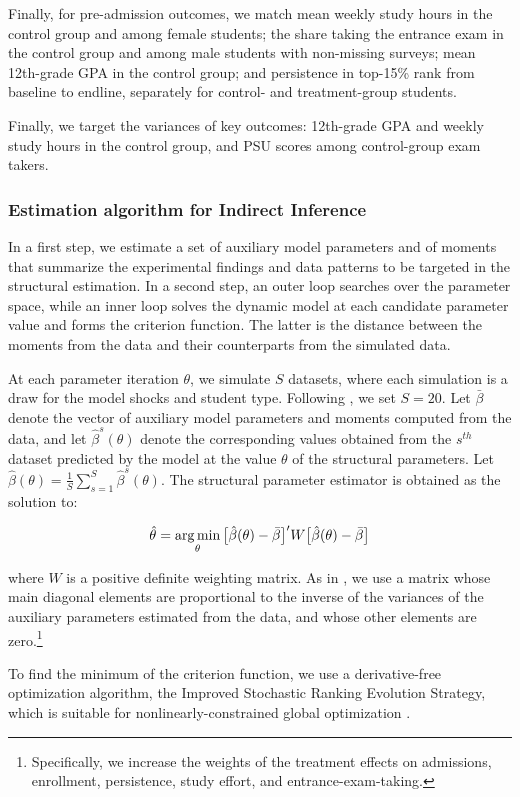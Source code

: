 Finally, for pre-admission outcomes, we match mean weekly study hours in the control group and among female students; the share taking the entrance exam in the control group and among male students with non-missing surveys; mean 12th-grade GPA in the control group; and persistence in top-15\% rank from baseline to endline, separately for control- and treatment-group students.\par 


Finally, we target the variances of key outcomes: 12th-grade GPA and weekly study hours in the control group, and PSU scores among control-group exam takers.\par


\subsubsection{Estimation algorithm for Indirect Inference}\label{sec:estimationwithin}
In a first step, we estimate a set of auxiliary model parameters and of moments that summarize the experimental findings and data patterns to be targeted in the structural estimation. In a second step, an outer loop searches over the parameter space, while an inner loop solves the dynamic model at each candidate parameter value and forms the criterion function. The latter is the distance between the moments from the data and their counterparts from the simulated data.\par 
At each parameter iteration $\theta$, we simulate $S$ datasets, where each simulation is a draw for the model shocks and student type. Following \citealp{eisenhauer2015estimation}, we set $S=20$. Let $\bar{\beta}$ denote the vector of auxiliary model parameters and moments computed from the data, and let $\hat{\beta}^s(\theta)$ denote the corresponding values obtained from the $s^{th}$ dataset predicted by the model at the value $\theta$ of the structural parameters. Let $\hat{\beta}(\theta)=\frac{1}{S} \sum_{s=1}^S \hat{\beta}^s(\theta)$.  The structural parameter estimator is obtained as the solution to:


\begin{equation}\label{eq:GII}
	\hat{\theta}=\operatorname*{arg\,min}_{\theta} \big[\hat{\beta}(\theta)-\bar{\beta}\big]'W\big[\hat{\beta}(\theta)-\bar{\beta}\big]
\end{equation}


\noindent where $W$ is a positive definite weighting matrix. As in \cite{gayle2019optimal}, we use a matrix whose main diagonal elements are proportional to the inverse of the variances of the auxiliary parameters estimated from the data, and whose other elements are zero.\footnote{Specifically,  we increase the weights of the treatment effects on admissions, enrollment, persistence, study effort, and entrance-exam-taking.}\par 

To find the minimum of the criterion function, we use a derivative-free optimization algorithm, the Improved Stochastic Ranking Evolution Strategy, which is suitable for nonlinearly-constrained global optimization \citep{runarsson2005search}.


